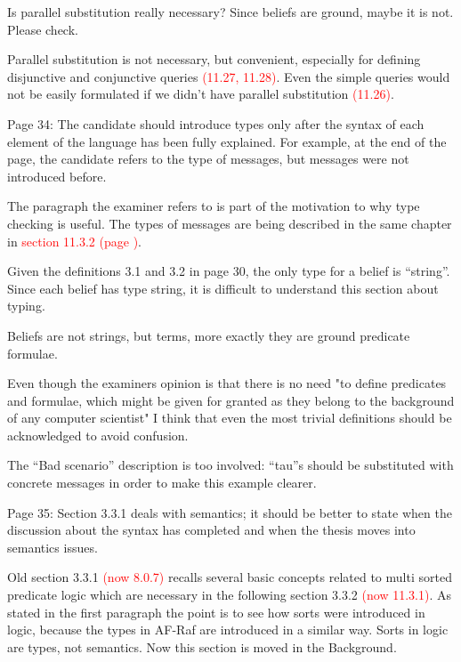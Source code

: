 \documentclass{article}
\newcommand*\R[1]{\textcolor{red}{#1}} %
\newcommand{\todo}[1]{[\textcolor{green}{TODO}: #1]}
\newenvironment{them}{\noindent\begingroup\color{blue}}{\endgroup\par}
\begin{document}
\begin{them}

Is parallel substitution really necessary? Since beliefs are ground, maybe it
is not. Please check.

\end{them}
Parallel substitution is not necessary, but convenient, especially for defining
disjunctive and conjunctive queries \R{(11.27, 11.28)}. Even the simple queries
would not be easily formulated if we didn't have parallel substitution \R{(11.26)}.

\begin{them}

Page 34:
The candidate should introduce types only after the syntax of each element of
the language has been fully explained. For example, at the end of the page, the
candidate refers to the type of messages, but messages were not introduced
before.

\end{them}
The paragraph the examiner refers to is part of the motivation to why type
checking is useful. The types of messages are being described in the same
chapter in \R{section 11.3.2 (page )}.

\begin{them}

Given the definitions 3.1 and 3.2 in page 30, the only type for a belief is
“string”. Since each belief has type string, it is difficult to understand this
section about typing.

\end{them}
Beliefs are not strings, but terms, more exactly they are ground predicate
formulae.

Even though the examiners opinion is that there is no need "to define
predicates and formulae, which might be given for granted as they belong to the
background of any computer scientist" I think that even the most trivial
definitions should be acknowledged to avoid confusion. 

\begin{them}

The “Bad scenario” description is too involved: “tau”s should be substituted
with concrete messages in order to make this example clearer.

\end{them}
\todo{}

\begin{them}

Page 35:
Section 3.3.1 deals with semantics; it should be better to state when the
discussion about the syntax has completed and when the thesis moves into
semantics issues.

\end{them}
Old section 3.3.1 \R{(now 8.0.7)} recalls several basic concepts related to
multi sorted predicate logic which are necessary in the following section 3.3.2
\R{(now 11.3.1)}. As stated in the first paragraph the point is to see how
sorts were introduced in logic, because the types in AF-Raf are introduced in a
similar way. Sorts in logic are types, not semantics. Now this section is moved
in the Background.
\end{document}
